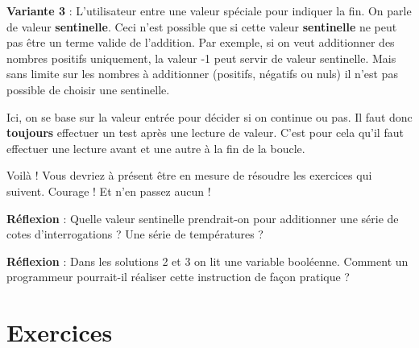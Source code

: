
		\textbf{Variante 3} :
		L'utilisateur entre une valeur spéciale pour indiquer la fin. 
		On parle de valeur \textbf{sentinelle}. 
		Ceci n'est possible que si cette valeur \textbf{sentinelle} ne peut pas être
		un terme valide de l'addition. Par exemple, si on veut
		additionner des nombres positifs uniquement, la valeur -1 peut servir
		de valeur sentinelle. Mais sans limite sur les nombres à additionner
		(positifs, négatifs ou nuls) il n'est pas possible de
		choisir une sentinelle.

		Ici, on se base sur la valeur entrée pour décider si on continue ou pas. 
		Il faut donc \textbf{toujours} effectuer un test
		après une lecture de valeur. C'est pour cela
		qu'il faut effectuer une lecture avant et une autre à
		la fin de la boucle.


		Voilà ! Vous devriez à présent être en mesure de
		résoudre les exercices qui suivent.
		Courage ! Et n'en passez aucun !

		\textbf{Réflexion} : 
		Quelle valeur sentinelle prendrait-on 
		pour additionner une série de cotes d'interrogations ? 
		Une série de températures ?

		\textbf{Réflexion} : 
		Dans les solutions 2 et 3 on lit une variable booléenne. 
		Comment un programmeur pourrait-il réaliser 
		cette instruction de façon pratique ?

\section{Exercices}

